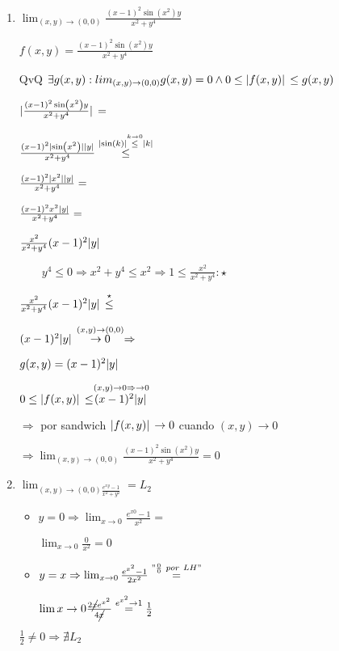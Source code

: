 \documentclass[../parcial.tex]{subfiles}
\begin{document}
    \begin{enumerate}
        \item $\lim_{(x,y) \to ( 0,0)} \frac{(x-1)^2\sin(x^2)y}{x^2 + y^4}$

            $ f(x,y) = \frac{(x-1)^2\sin(x^2)y}{x^2 + y^4} $

            QvQ $ \exists g(x,y) : lim_{(x,y) \to (0,0)} g(x,y) = 0 \wedge 0 \leq \abs*{f(x,y)} \leq g(x,y)$

            $ \abs*{\frac{(x-1)^2\sin(x^2)y}{x^2 + y^4}} = $

            $ \frac{(x-1)^2\abs*{\sin(x^2)}\abs*{y}}{x^2 + y^4} \stackrel{\abs*{\sin(k)} \stackrel{k \to 0}{\leq} \abs*{k}}{\leq}$

            $ \frac{(x-1)^2\abs*{x^2}\abs*{y}}{x^2 + y^4} = $

            $ \frac{(x-1)^2x^2\abs*{y}}{x^2 + y^4} = $
            
            $ \frac{x^2}{x^2 + y^4}(x-1)^2\abs*{y} $

            $ \qquad y^4 \leq 0 \Rightarrow x^2 + y^4 \leq x^2 \Rightarrow 1 \leq \frac{x^2}{x^2+y^4} :\star $

            $ \frac{x^2}{x^2 + y^4}(x-1)^2\abs*{y} \stackrel{\star}{\leq} $

            $ (x-1)^2\abs*{y} \stackrel{(x,y) \to (0,0)}{\to 0} \Rightarrow$

            $ g(x,y) = (x-1)^2\abs*{y} $

            $ 0 \leq \abs*{f(x,y)} \leq \stackrel{(x,y) \to 0 \Rightarrow \to 0}{(x-1)^2\abs*{y}} $

            $ \Rightarrow $ por sandwich $\abs*{f(x,y)} \to 0$ cuando $(x,y) \to 0$

            $ \Rightarrow \lim_{(x,y) \to ( 0,0)} \frac{(x-1)^2\sin(x^2)y}{x^2 + y^4} = 0 $

        \item $\lim_{(x,y) \to (0,0) \frac{e^{xy}-1}{x^2+y^2}} = L_2$

            \begin{itemize}

                \item $y = 0 \Rightarrow \lim_{x \to 0} \frac{e^{x0}-1}{x^2} = $

                    $\lim_{x \to 0} \frac{0}{x^2} = 0$

                \item $y = x \Rightarrow \lim_{x \to 0} \frac{e^{x^2}-1}{2x^2} \stackrel{"\frac{0}{0}\ por\ LH"}{=}$

                    $ \lim{x \to 0} \frac{2\cancel{x}e^{x^2}}{4\cancel{x}} \stackrel{e^{x^2} \to 1}{=} \frac{1}{2} $
            \end{itemize}

            $\frac{1}{2} \neq 0 \Rightarrow \nexists L_2$

    \end{enumerate}
\end{document}
